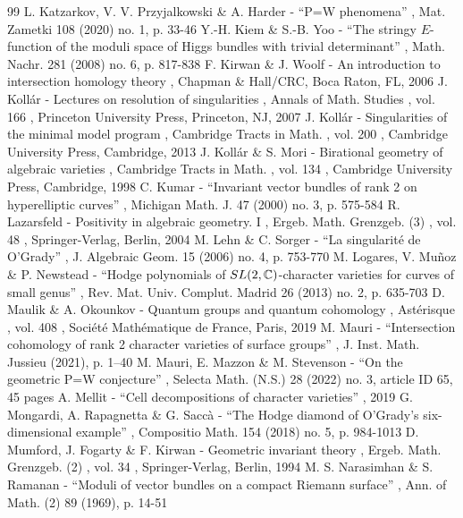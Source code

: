 \documentclass[11pt]{article}
\theoremstyle{definition}
\begin{document}
\begin{thebibliography}{99}
 L. Katzarkov, V. V. Przyjalkowski \& A. Harder - “P=W phenomena” , Mat. Zametki 108 (2020) no. 1, p. 33-46
 Y.-H. Kiem \& S.-B. Yoo - “The stringy $E$-function of the moduli space of Higgs bundles with trivial determinant” , Math. Nachr. 281 (2008) no. 6, p. 817-838
 F. Kirwan \& J. Woolf - An introduction to intersection homology theory , Chapman \& Hall/CRC, Boca Raton, FL, 2006
 J. Kollár - Lectures on resolution of singularities , Annals of Math. Studies , vol. 166 , Princeton University Press, Princeton, NJ, 2007
 J. Kollár - Singularities of the minimal model program , Cambridge Tracts in Math. , vol. 200 , Cambridge University Press, Cambridge, 2013
 J. Kollár \& S. Mori - Birational geometry of algebraic varieties , Cambridge Tracts in Math. , vol. 134 , Cambridge University Press, Cambridge, 1998
 C. Kumar - “Invariant vector bundles of rank 2 on hyperelliptic curves” , Michigan Math. J. 47 (2000) no. 3, p. 575-584
 R. Lazarsfeld - Positivity in algebraic geometry. I , Ergeb. Math. Grenzgeb. (3) , vol. 48 , Springer-Verlag, Berlin, 2004
 M. Lehn \& C. Sorger - “La singularité de O’Grady” , J. Algebraic Geom. 15 (2006) no. 4, p. 753-770
 M. Logares, V. Muñoz \& P. Newstead - “Hodge polynomials of ${\rm SL}(2,\mathbb{C})$-character varieties for curves of small genus” , Rev. Mat. Univ. Complut. Madrid 26 (2013) no. 2, p. 635-703
 D. Maulik \& A. Okounkov - Quantum groups and quantum cohomology , Astérisque , vol. 408 , Société Mathématique de France, Paris, 2019
 M. Mauri - “Intersection cohomology of rank 2 character varieties of surface groups” , J. Inst. Math. Jussieu (2021), p. 1–40
 M. Mauri, E. Mazzon \& M. Stevenson - “On the geometric P=W conjecture” , Selecta Math. (N.S.) 28 (2022) no. 3, article ID 65, 45 pages
 A. Mellit - “Cell decompositions of character varieties” , 2019
 G. Mongardi, A. Rapagnetta \& G. Saccà - “The Hodge diamond of O’Grady’s six-dimensional example” , Compositio Math. 154 (2018) no. 5, p. 984-1013
 D. Mumford, J. Fogarty \& F. Kirwan - Geometric invariant theory , Ergeb. Math. Grenzgeb. (2) , vol. 34 , Springer-Verlag, Berlin, 1994
 M. S. Narasimhan \& S. Ramanan - “Moduli of vector bundles on a compact Riemann surface” , Ann. of Math. (2) 89 (1969), p. 14-51

\end{thebibliography}
\end{document}
